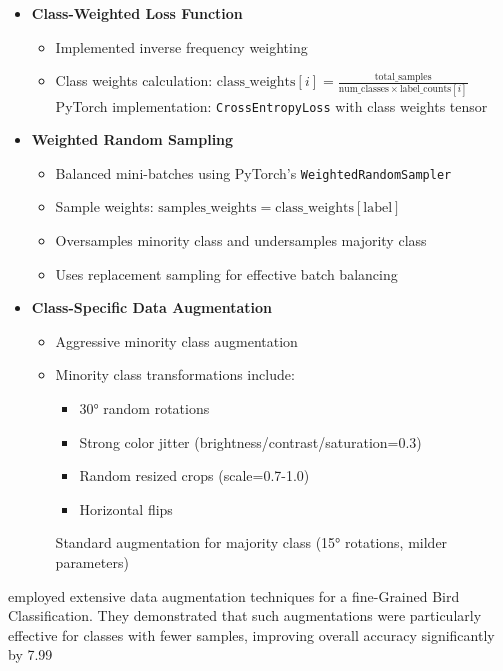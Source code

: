 \documentclass[a4paper,12pt]{report}
\begin{document}
\begin{itemize}
    \item \textbf{Class-Weighted Loss Function}
    \begin{itemize}
        \item Implemented inverse frequency weighting \citep{cui2019classbalanced}
        \item Class weights calculation: \( \text{class\_weights}[i] = \frac{\text{total\_samples}}{\text{num\_classes} \times \text{label\_counts}[i]} \)
        \subitem PyTorch implementation: \texttt{CrossEntropyLoss} with class weights tensor
    \end{itemize}
    
    \item \textbf{Weighted Random Sampling}
    \begin{itemize}
        \item Balanced mini-batches using PyTorch's \texttt{WeightedRandomSampler}
        \item Sample weights: \( \text{samples\_weights} = \text{class\_weights}[\text{label}] \)
        \item Oversamples minority class and undersamples majority class \citep{buda2018systematic}
        \item Uses replacement sampling for effective batch balancing
    \end{itemize}

    \item \textbf{Class-Specific Data Augmentation}
    \begin{itemize}
        \item Aggressive minority class augmentation \citep{shorten2019survey}
        \item Minority class transformations include:
        \begin{itemize}
            \item 30° random rotations
            \item Strong color jitter (brightness/contrast/saturation=0.3)
            \item Random resized crops (scale=0.7-1.0)
            \item Horizontal flips
        \end{itemize}
        \subitem Standard augmentation for majority class (15° rotations, milder parameters)
    \end{itemize}
\end{itemize}

\citep{chu2020fine} employed extensive data augmentation techniques for a fine-Grained Bird Classification. They demonstrated that such augmentations were particularly effective for classes with fewer samples, improving overall accuracy significantly by 7.99%
\end{document}
